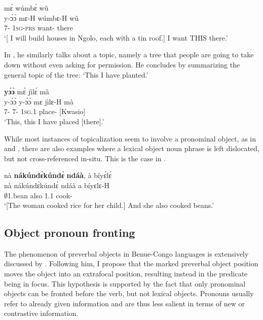 \ea \label{Top1}
   mɛ́ wúmbɛ́ wû\\
        y-ɔ́ɔ̀ mɛ-H wúmbɛ-H wû\\
         7-{\OBJ} 1\textsc{sg}-\textsc{prs} want-{\R} there\\
    \trans `[ I will build houses in Ngolo, each with a tin roof.] I want THIS there.'
\z

In , he similarly talks about a topic, namely a tree that people are going to take down without even asking for permission. He concludes by summarizing the general topic of the tree: `This I have planted.'

\ea \label{Top2}
   {\bfseries yɔ́ɔ̀} mɛ̀ jìlɛ́ mà \\
       y-ɔ́ɔ̀ y-ɔ́ɔ̀ mɛ jìlɛ-H mà \\
      7-{\OBJ} 7-{\OBJ} 1\textsc{sg}.{\PST}1 place-{\R} {\COMPL}[Kwasio]    \\
    \trans `This, this I have placed [there].'
\z

While most instances of topicalization seem to involve a pronominal object, as in  and , there are also examples where a lexical object noun phrase is left dislocated, but not cross-referenced in-situ. This is the case in .

\ea \label{Top3} 
   \glll nà {\bfseries nákúndɛ̀kúndɛ̀} {\bfseries ndáà}, à bíyɛ́lɛ́\\
           nà nákúndɛ̀kúndɛ̀ ndáà a bíyɛlɛ-H\\
       {\CONJ} $\emptyset$1.bean also 1.{\PST}1 cook-{\PST}\\
    \trans `[The woman cooked rice for her child.] And she also cooked beans.'
\z











\subsection{Object pronoun fronting}
\label{sec:OBJfront}

The phenomenon of preverbal objects in Benue-Congo languages is extensively discussed by \citet{guldemann2007}. Following him, I propose that the marked preverbal object position moves the object into an extrafocal position, resulting instead in the predicate being in focus. This hypothesis is supported by the fact that only pronominal objects can be fronted before the verb, but not lexical objects. Pronouns usually refer to already given information and are thus less salient in terms of new or contrastive information.

